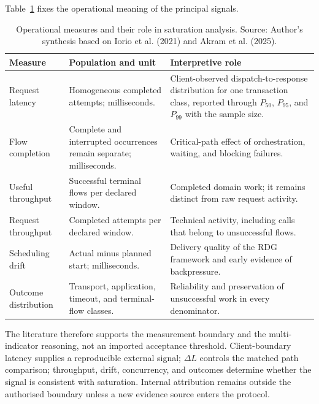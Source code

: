 \noindent Table~\ref{tab:metric-semantics} fixes the operational meaning of the principal
signals.

\begingroup
\renewcommand{\arraystretch}{1.0}
\begin{table}[H]
    \centering
    \caption[Operational measures for saturation analysis]{Operational measures
    and their role in saturation analysis. Source: Author's synthesis based on Iorio et al. (2021) and Akram et al. (2025).}
    \label{tab:metric-semantics}
    \small
    \begin{tabular}{|>{\raggedright\arraybackslash}p{2.7cm}|>{\raggedright\arraybackslash}p{4.0cm}|>{\raggedright\arraybackslash}p{4.9cm}|}
    \hline
    \rowcolor{veryPeri!18}
    \textbf{Measure} & \textbf{Population and unit} & \textbf{Interpretive role} \\
    \hline
    \rowcolor{tableGray}
    Request latency & Homogeneous completed attempts; milliseconds. & Client-observed dispatch-to-response distribution for one transaction class, reported through $P_{50}$, $P_{95}$, and $P_{99}$ with the sample size. \\
    \hline
    Flow completion & Complete and interrupted occurrences remain separate; milliseconds. & Critical-path effect of orchestration, waiting, and blocking failures. \\
    \hline
    \rowcolor{tableGray}
    Useful throughput & Successful terminal flows per declared window. & Completed domain work; it remains distinct from raw request activity. \\
    \hline
    Request throughput & Completed attempts per declared window. & Technical activity, including calls that belong to unsuccessful flows. \\
    \hline
    \rowcolor{tableGray}
    Scheduling drift & Actual minus planned start; milliseconds. & Delivery quality of the RDG framework and early evidence of backpressure. \\
    \hline
    Outcome distribution & Transport, application, timeout, and terminal-flow classes. & Reliability and preservation of unsuccessful work in every denominator. \\
    \hline
\end{tabular}
\end{table}
\endgroup

\noindent The literature therefore supports the measurement boundary and the
multi-indicator reasoning, not an imported acceptance threshold. Client-boundary
latency supplies a reproducible external signal; $\Delta L$ controls the matched
path comparison; throughput, drift, concurrency, and outcomes determine whether
the signal is consistent with saturation. Internal attribution remains outside
the authorised boundary unless a new evidence source enters the protocol.

